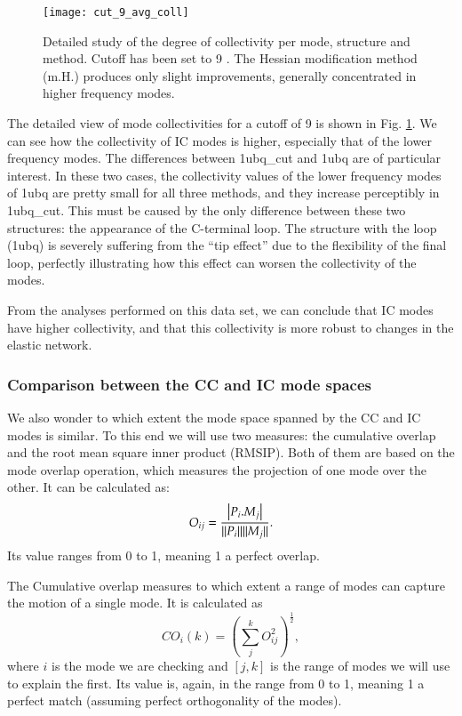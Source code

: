\begin{figure}
\texttt{[image: cut\_9\_avg\_coll]}
\caption{Detailed study of the degree of collectivity per mode, structure and method. Cutoff has been set to 9 \angstrom. The Hessian modification method (m.H.) produces only slight improvements, generally concentrated in higher frequency modes.}
\label{fig:cut_9_avg_coll}
\end{figure}

The detailed view of mode collectivities for a cutoff of 9 \angstrom  is shown in Fig. \ref{fig:cut_9_avg_coll}. We can see how the collectivity of IC modes is higher, especially that of the lower frequency modes. The differences between 1ubq\_cut and 1ubq are of particular interest. In these two cases, the collectivity values of the lower frequency modes of 1ubq are pretty small for all three methods, and they increase perceptibly in 1ubq\_cut. This must be caused by the only difference between these two structures: the appearance of the C-terminal loop. The structure with the loop (1ubq) is severely suffering from the ``tip effect'' due to the flexibility of the final loop, perfectly illustrating how this effect can worsen the collectivity of the modes.  

From the analyses performed on this data set, we can conclude that IC modes have higher collectivity, and  that this collectivity is more robust to changes in the elastic network.  

\subsubsection{Comparison between the CC and IC mode spaces}

We also wonder to which extent the mode space spanned by the CC and IC modes is similar. To this end we will use two measures: the cumulative overlap and the root mean square inner product (RMSIP). Both of them are based on the mode overlap operation, which measures the projection of one mode over the other. It can be calculated as:
\begin{equation}
O_{ij} = \frac{\left | P_i . M_j \right |}{{\Arrowvert P_i\Arrowvert}{\Arrowvert M_j\Arrowvert}} .
\end{equation}
Its value ranges from 0 to 1, meaning 1 a perfect overlap.  

The Cumulative overlap \cite{yang_close_2008} measures to which extent a range of modes can capture the motion of a single mode. It is calculated as
\begin{equation}
CO_i(k)= (\sum_{j}^{k} O_{ij}^2)^\frac{1}{2},
\end{equation}
where $i$ is the mode we are checking and $[j,k]$ is the range of modes we will use to explain the first. Its value is, again, in the range from 0 to 1, meaning 1 a perfect match (assuming perfect orthogonality of the modes).   

